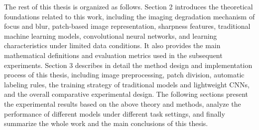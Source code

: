 \par The rest of this thesis is organized as follows. Section 2 introduces the
theoretical foundations related to this work, including the imaging degradation
mechanism of focus and blur, patch-based image representation, sharpness
features, traditional machine learning models, convolutional neural networks,
and learning characteristics under limited data conditions. It also provides the
main mathematical definitions and evaluation metrics used in the subsequent
experiments. Section 3 describes in detail the method design and implementation
process of this thesis, including image preprocessing, patch division, automatic
labeling rules, the training strategy of traditional models and lightweight
CNNs, and the overall comparative experimental design. The following sections
present the experimental results based on the above theory and methods, analyze
the performance of different models under different task settings, and finally
summarize the whole work and the main conclusions of this thesis.

